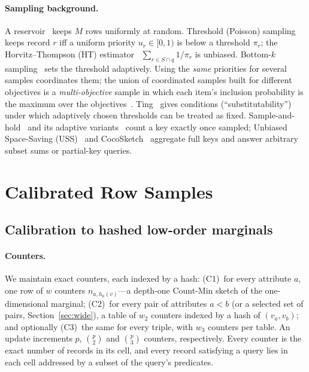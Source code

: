 \documentclass[sigconf]{acmart}
\begin{document}
\paragraph{Sampling background.} A reservoir~\cite{vitter,li} keeps $M$ rows uniformly at random.
Threshold (Poisson) sampling keeps record $r$ iff a uniform priority $u_r\in[0,1)$ is below a threshold
$\pi_r$; the Horvitz--Thompson (HT) estimator~\cite{ht} $\sum_{r\in S\cap q}1/\pi_r$ is unbiased.
Bottom-$k$ sampling~\cite{bottomk,priority} sets the threshold adaptively. Using the \emph{same}
priorities for several samples coordinates them; the union of coordinated samples built for different
objectives is a \emph{multi-objective} sample in which each item's inclusion probability is the maximum
over the objectives~\cite{cohen-mo}. Ting~\cite{ting-ats} gives conditions (``substitutability'') under
which adaptively chosen thresholds can be treated as fixed. Sample-and-hold~\cite{sah,cm-counting} and its
adaptive variants~\cite{ash-insert,ash} count a key exactly once sampled; Unbiased Space-Saving
(USS)~\cite{ting-uss} and CocoSketch~\cite{coco} aggregate full keys and answer arbitrary subset sums or
partial-key queries.

\section{Calibrated Row Samples}\label{sec:methods}

\subsection{Calibration to hashed low-order marginals}\label{sec:cal}

\paragraph{Counters.} We maintain exact counters, each indexed by a hash:
(C1)~for every attribute $a$, one row of $w$ counters $n_{a,h_a(v)}$---a depth-one Count-Min sketch of
the one-dimensional marginal; (C2)~for every pair of attributes $a<b$ (or a selected set of pairs,
Section~\ref{sec:wide}), a table of $w_2$ counters indexed by a hash of $(v_a,v_b)$; and optionally
(C3)~the same for every triple, with $w_3$ counters per table. An update increments $p$, $\binom p2$ and
$\binom p3$ counters, respectively. Every counter is the exact number of records in its cell, and every
record satisfying a query lies in each cell addressed by a subset of the query's predicates.
\end{document}
